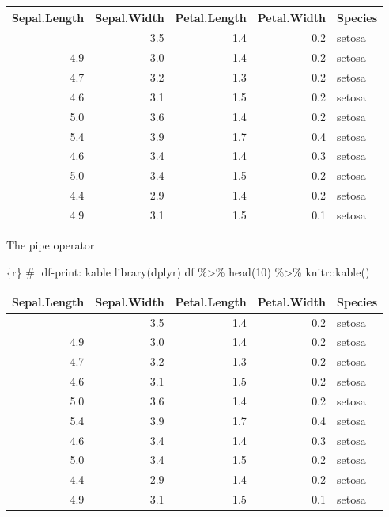 \documentclass[
  letterpaper,
  DIV=11,
  numbers=noendperiod,
  oneside]{scrreprt}
\newenvironment{Shaded}{\begin{snugshade}}{\end{snugshade}}
\newcommand{\CommentTok}[1]{\textcolor[rgb]{0.37,0.37,0.37}{#1}}
\newcommand{\DecValTok}[1]{\textcolor[rgb]{0.68,0.00,0.00}{#1}}
\newcommand{\FunctionTok}[1]{\textcolor[rgb]{0.28,0.35,0.67}{#1}}
\newcommand{\InformationTok}[1]{\textcolor[rgb]{0.37,0.37,0.37}{#1}}
\newcommand{\NormalTok}[1]{\textcolor[rgb]{0.00,0.23,0.31}{#1}}
\newcommand{\SpecialCharTok}[1]{\textcolor[rgb]{0.37,0.37,0.37}{#1}}
\begin{document}
\begin{longtable}[]{@{}rrrrl@{}}
\toprule\noalign{}
Sepal.Length & Sepal.Width & Petal.Length & Petal.Width & Species \\
\midrule\noalign{}
\endhead
\bottomrule\noalign{}
\endlastfoot
5.1 & 3.5 & 1.4 & 0.2 & setosa \\
4.9 & 3.0 & 1.4 & 0.2 & setosa \\
4.7 & 3.2 & 1.3 & 0.2 & setosa \\
4.6 & 3.1 & 1.5 & 0.2 & setosa \\
5.0 & 3.6 & 1.4 & 0.2 & setosa \\
5.4 & 3.9 & 1.7 & 0.4 & setosa \\
4.6 & 3.4 & 1.4 & 0.3 & setosa \\
5.0 & 3.4 & 1.5 & 0.2 & setosa \\
4.4 & 2.9 & 1.4 & 0.2 & setosa \\
4.9 & 3.1 & 1.5 & 0.1 & setosa \\
\end{longtable}

The pipe operator

\begin{Shaded}
\begin{Highlighting}[]
\InformationTok{\textasciigrave{}\textasciigrave{}\textasciigrave{}\{r\}}
\CommentTok{\#| df{-}print: kable}
\FunctionTok{library}\NormalTok{(dplyr)}
\NormalTok{df }\SpecialCharTok{\%\textgreater{}\%}
  \FunctionTok{head}\NormalTok{(}\DecValTok{10}\NormalTok{) }\SpecialCharTok{\%\textgreater{}\%}
\NormalTok{  knitr}\SpecialCharTok{::}\FunctionTok{kable}\NormalTok{()}
\InformationTok{\textasciigrave{}\textasciigrave{}\textasciigrave{}}
\end{Highlighting}
\end{Shaded}

\begin{longtable}[]{@{}rrrrl@{}}
\toprule\noalign{}
Sepal.Length & Sepal.Width & Petal.Length & Petal.Width & Species \\
\midrule\noalign{}
\endhead
\bottomrule\noalign{}
\endlastfoot
5.1 & 3.5 & 1.4 & 0.2 & setosa \\
4.9 & 3.0 & 1.4 & 0.2 & setosa \\
4.7 & 3.2 & 1.3 & 0.2 & setosa \\
4.6 & 3.1 & 1.5 & 0.2 & setosa \\
5.0 & 3.6 & 1.4 & 0.2 & setosa \\
5.4 & 3.9 & 1.7 & 0.4 & setosa \\
4.6 & 3.4 & 1.4 & 0.3 & setosa \\
5.0 & 3.4 & 1.5 & 0.2 & setosa \\
4.4 & 2.9 & 1.4 & 0.2 & setosa \\
4.9 & 3.1 & 1.5 & 0.1 & setosa \\
\end{longtable}
\end{document}
